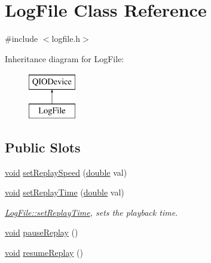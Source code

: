 \hypertarget{class_log_file}{\section{Log\-File Class Reference}
\label{class_log_file}
}


{\ttfamily \#include $<$logfile.\-h$>$}

Inheritance diagram for Log\-File\-:\begin{figure}[H]
\begin{center}
\leavevmode
\includegraphics[height=2.000000cm]{class_log_file}
\end{center}
\end{figure}
\subsection*{Public Slots}
\begin{DoxyCompactItemize}
\item 
\hyperlink{group___u_a_v_objects_plugin_ga444cf2ff3f0ecbe028adce838d373f5c}{void} \hyperlink{class_log_file_ab7a03016cf2c61cfe5cf7b477e9b3de5}{set\-Replay\-Speed} (\hyperlink{_super_l_u_support_8h_a8956b2b9f49bf918deed98379d159ca7}{double} val)
\item 
\hyperlink{group___u_a_v_objects_plugin_ga444cf2ff3f0ecbe028adce838d373f5c}{void} \hyperlink{class_log_file_a1b02fa57111680a530d15abaa87e4d11}{set\-Replay\-Time} (\hyperlink{_super_l_u_support_8h_a8956b2b9f49bf918deed98379d159ca7}{double} val)
\begin{DoxyCompactList}\small\item\em \hyperlink{class_log_file_a1b02fa57111680a530d15abaa87e4d11}{Log\-File\-::set\-Replay\-Time}, sets the playback time. \end{DoxyCompactList}\item 
\hyperlink{group___u_a_v_objects_plugin_ga444cf2ff3f0ecbe028adce838d373f5c}{void} \hyperlink{class_log_file_a148ec54d47b9dc4fec33058e4c849240}{pause\-Replay} ()
\item 
\hyperlink{group___u_a_v_objects_plugin_ga444cf2ff3f0ecbe028adce838d373f5c}{void} \hyperlink{class_log_file_a52d5f07ff960070107e6f19d0fb7a8f5}{resume\-Replay} ()
\end{DoxyCompactItemize}
